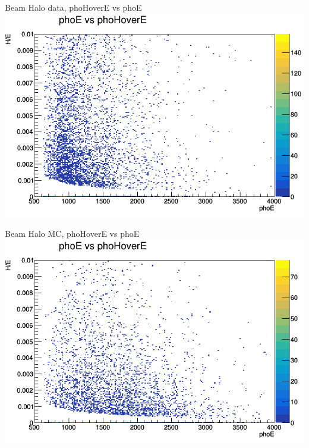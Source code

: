 \documentclass{beamer}
\begin{document}
\begin{frame}{Beam Halo data, phoHoverE vs phoE}
    \includegraphics[width=\linewidth]{phoE_vs_phoHoverE_anTGCtree_data_beamhalo.png}
\end{frame}
\begin{frame}{Beam Halo MC, phoHoverE vs phoE}
    \includegraphics[width=\linewidth]{phoE_vs_phoHoverE_anTGCtree_MC_beamhalo.png}
\end{frame}
\end{document}

